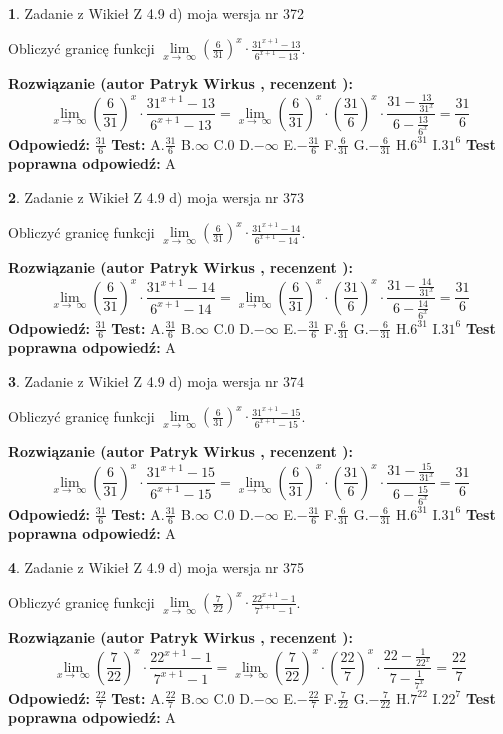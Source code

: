 \documentclass[12pt, a4paper]{article}
\theoremstyle{definition} %
\newtheorem{zad}{}
\newcommand{\zadStart}[1]{\begin{zad}#1\newline}
\newcommand{\zadStop}{\end{zad}}
\newcommand{\rozwStart}[2]{\noindent \textbf{Rozwiązanie (autor #1 , recenzent #2): }\newline}
\newcommand{\rozwStop}{\newline}
\newcommand{\odpStart}{\noindent \textbf{Odpowiedź:}\newline}
\newcommand{\odpStop}{\newline}
\newcommand{\testStart}{\noindent \textbf{Test:}\newline}
\newcommand{\testStop}{\newline}
\newcommand{\kluczStart}{\noindent \textbf{Test poprawna odpowiedź:}\newline}
\newcommand{\kluczStop}{\newline}
\begin{document}
\zadStart{Zadanie z Wikieł Z 4.9 d) moja wersja nr 372}


Obliczyć granicę funkcji  $\lim\limits_{x\to\ \infty}(\frac{6}{31})^{x}\cdot\frac{31^{x+1}-13}{6^{x+1}-13}$.
\zadStop
\rozwStart{Patryk Wirkus}{}
$$\lim\limits_{x\to\ \infty}(\frac{6}{31})^{x}\cdot\frac{31^{x+1}-13}{6^{x+1}-13}=\lim\limits_{x\to\ \infty}(\frac{6}{31})^{x}\cdot(\frac{31}{6})^{x} \cdot \frac{31-\frac{13}{31^{x}}}{6-\frac{13}{6^{x}}} = \frac{31}{6}$$
\rozwStop
\odpStart
$\frac{31}{6}$
\odpStop
\testStart
A.$\frac{31}{6}$ B.$\infty$ C.$0$ D.$-\infty$ E.$-\frac{31}{6}$
F.$\frac{6}{31}$ G.$-\frac{6}{31}$
H.$6^{31}$
I.$31^{6}$
\testStop
\kluczStart
A
\kluczStop



\zadStart{Zadanie z Wikieł Z 4.9 d) moja wersja nr 373}


Obliczyć granicę funkcji  $\lim\limits_{x\to\ \infty}(\frac{6}{31})^{x}\cdot\frac{31^{x+1}-14}{6^{x+1}-14}$.
\zadStop
\rozwStart{Patryk Wirkus}{}
$$\lim\limits_{x\to\ \infty}(\frac{6}{31})^{x}\cdot\frac{31^{x+1}-14}{6^{x+1}-14}=\lim\limits_{x\to\ \infty}(\frac{6}{31})^{x}\cdot(\frac{31}{6})^{x} \cdot \frac{31-\frac{14}{31^{x}}}{6-\frac{14}{6^{x}}} = \frac{31}{6}$$
\rozwStop
\odpStart
$\frac{31}{6}$
\odpStop
\testStart
A.$\frac{31}{6}$ B.$\infty$ C.$0$ D.$-\infty$ E.$-\frac{31}{6}$
F.$\frac{6}{31}$ G.$-\frac{6}{31}$
H.$6^{31}$
I.$31^{6}$
\testStop
\kluczStart
A
\kluczStop



\zadStart{Zadanie z Wikieł Z 4.9 d) moja wersja nr 374}


Obliczyć granicę funkcji  $\lim\limits_{x\to\ \infty}(\frac{6}{31})^{x}\cdot\frac{31^{x+1}-15}{6^{x+1}-15}$.
\zadStop
\rozwStart{Patryk Wirkus}{}
$$\lim\limits_{x\to\ \infty}(\frac{6}{31})^{x}\cdot\frac{31^{x+1}-15}{6^{x+1}-15}=\lim\limits_{x\to\ \infty}(\frac{6}{31})^{x}\cdot(\frac{31}{6})^{x} \cdot \frac{31-\frac{15}{31^{x}}}{6-\frac{15}{6^{x}}} = \frac{31}{6}$$
\rozwStop
\odpStart
$\frac{31}{6}$
\odpStop
\testStart
A.$\frac{31}{6}$ B.$\infty$ C.$0$ D.$-\infty$ E.$-\frac{31}{6}$
F.$\frac{6}{31}$ G.$-\frac{6}{31}$
H.$6^{31}$
I.$31^{6}$
\testStop
\kluczStart
A
\kluczStop



\zadStart{Zadanie z Wikieł Z 4.9 d) moja wersja nr 375}


Obliczyć granicę funkcji  $\lim\limits_{x\to\ \infty}(\frac{7}{22})^{x}\cdot\frac{22^{x+1}-1}{7^{x+1}-1}$.
\zadStop
\rozwStart{Patryk Wirkus}{}
$$\lim\limits_{x\to\ \infty}(\frac{7}{22})^{x}\cdot\frac{22^{x+1}-1}{7^{x+1}-1}=\lim\limits_{x\to\ \infty}(\frac{7}{22})^{x}\cdot(\frac{22}{7})^{x} \cdot \frac{22-\frac{1}{22^{x}}}{7-\frac{1}{7^{x}}} = \frac{22}{7}$$
\rozwStop
\odpStart
$\frac{22}{7}$
\odpStop
\testStart
A.$\frac{22}{7}$ B.$\infty$ C.$0$ D.$-\infty$ E.$-\frac{22}{7}$
F.$\frac{7}{22}$ G.$-\frac{7}{22}$
H.$7^{22}$
I.$22^{7}$
\testStop
\kluczStart
A
\kluczStop
\end{document}
